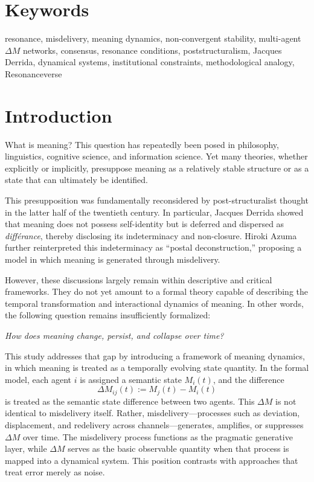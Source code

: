 \documentclass[11pt,a4paper]{article}
\theoremstyle{definition}
\begin{document}
\section*{Keywords}
resonance, misdelivery, meaning dynamics, non-convergent stability, multi-agent $\Delta M$ networks, consensus, resonance conditions, poststructuralism, Jacques Derrida, dynamical systems, institutional constraints, methodological analogy, Resonanceverse

\section{Introduction}

What is meaning? This question has repeatedly been posed in philosophy, linguistics, cognitive science, and information science. Yet many theories, whether explicitly or implicitly, presuppose meaning as a relatively stable structure or as a state that can ultimately be identified.

This presupposition was fundamentally reconsidered by post-structuralist thought in the latter half of the twentieth century. In particular, Jacques Derrida showed that meaning does not possess self-identity but is deferred and dispersed as \textit{différance}, thereby disclosing its indeterminacy and non-closure. Hiroki Azuma further reinterpreted this indeterminacy as ``postal deconstruction,'' proposing a model in which meaning is generated through misdelivery.

However, these discussions largely remain within descriptive and critical frameworks. They do not yet amount to a formal theory capable of describing the temporal transformation and interactional dynamics of meaning. In other words, the following question remains insufficiently formalized:

\textit{How does meaning change, persist, and collapse over time?}

This study addresses that gap by introducing a framework of meaning dynamics, in which meaning is treated as a temporally evolving state quantity. In the formal model, each agent $i$ is assigned a semantic state $M_i(t)$, and the difference
\[
\Delta M_{ij}(t) := M_j(t) - M_i(t)
\]
is treated as the semantic state difference between two agents. This $\Delta M$ is not identical to misdelivery itself. Rather, misdelivery---processes such as deviation, displacement, and redelivery across channels---generates, amplifies, or suppresses $\Delta M$ over time. The misdelivery process functions as the pragmatic generative layer, while $\Delta M$ serves as the basic observable quantity when that process is mapped into a dynamical system. This position contrasts with approaches that treat error merely as noise.
\end{document}
